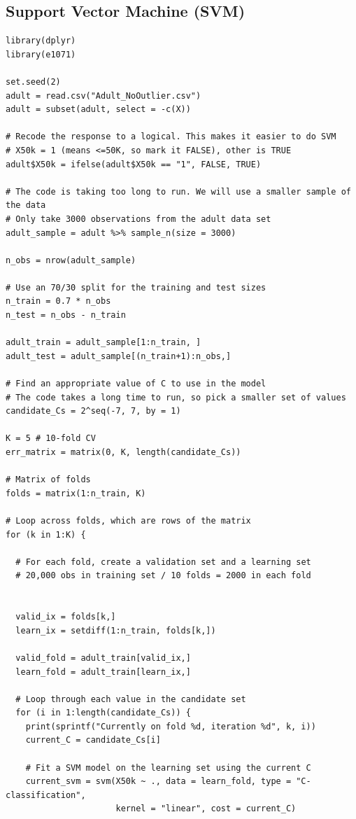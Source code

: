 \documentclass{article}
\begin{document}
\subsection{Support Vector Machine (SVM)} \label{app:SVMCode}

\begin{verbatim}
library(dplyr)
library(e1071)

set.seed(2)
adult = read.csv("Adult_NoOutlier.csv")
adult = subset(adult, select = -c(X))

# Recode the response to a logical. This makes it easier to do SVM
# X50k = 1 (means <=50K, so mark it FALSE), other is TRUE
adult$X50k = ifelse(adult$X50k == "1", FALSE, TRUE)

# The code is taking too long to run. We will use a smaller sample of the data
# Only take 3000 observations from the adult data set 
adult_sample = adult %>% sample_n(size = 3000)

n_obs = nrow(adult_sample)

# Use an 70/30 split for the training and test sizes
n_train = 0.7 * n_obs
n_test = n_obs - n_train

adult_train = adult_sample[1:n_train, ]
adult_test = adult_sample[(n_train+1):n_obs,]

# Find an appropriate value of C to use in the model 
# The code takes a long time to run, so pick a smaller set of values
candidate_Cs = 2^seq(-7, 7, by = 1)

K = 5 # 10-fold CV
err_matrix = matrix(0, K, length(candidate_Cs))

# Matrix of folds 
folds = matrix(1:n_train, K)

# Loop across folds, which are rows of the matrix 
for (k in 1:K) {
  
  # For each fold, create a validation set and a learning set 
  # 20,000 obs in training set / 10 folds = 2000 in each fold 
  
  
  valid_ix = folds[k,]
  learn_ix = setdiff(1:n_train, folds[k,])
  
  valid_fold = adult_train[valid_ix,]
  learn_fold = adult_train[learn_ix,]
  
  # Loop through each value in the candidate set 
  for (i in 1:length(candidate_Cs)) {
    print(sprintf("Currently on fold %d, iteration %d", k, i))
    current_C = candidate_Cs[i]
    
    # Fit a SVM model on the learning set using the current C
    current_svm = svm(X50k ~ ., data = learn_fold, type = "C-classification",
                      kernel = "linear", cost = current_C)
    

\end{verbatim}
\end{document}

